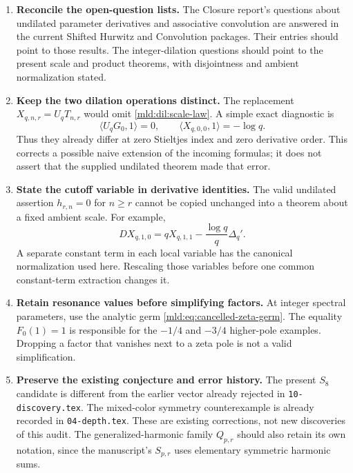 \begin{enumerate}[label=\arabic*.]
\item \textbf{Reconcile the open-question lists.}
The Closure report's questions about undilated parameter derivatives and
associative convolution are answered in the current Shifted Hurwitz and
Convolution packages. Their entries should point to those results.
The integer-dilation questions should point to the present scale and
product theorems, with disjointness and ambient normalization stated.

\item \textbf{Keep the two dilation operations distinct.}
The replacement $X_{q,n,r}=U_qT_{n,r}$ would omit
\eqref{mld:dil:scale-law}. A simple exact diagnostic is
\[
 \langle U_qG_0,1\rangle=0,\qquad
 \langle X_{q,0,0},1\rangle=-\log q.
\]
Thus they already differ at zero Stieltjes index and zero derivative
order. This corrects a possible naive extension of the incoming formulas;
it does not assert that the supplied undilated theorem made that error.

\item \textbf{State the cutoff variable in derivative identities.}
The valid undilated assertion $h_{r,n}=0$ for $n\ge r$ cannot be copied
unchanged into a theorem about a fixed ambient scale. For example,
\[
 DX_{q,1,0}=qX_{q,1,1}-\frac{\log q}{q}\Delta_q'.
\]
A separate constant term in each local variable has the canonical
normalization used here. Rescaling those variables before one common
constant-term extraction changes it.

\item \textbf{Retain resonance values before simplifying factors.}
At integer spectral parameters, use the analytic germ
\eqref{mld:eq:cancelled-zeta-germ}. The equality $F_0(1)=1$ is responsible
for the $-1/4$ and $-3/4$ higher-pole examples. Dropping a factor that
vanishes next to a zeta pole is not a valid simplification.

\item \textbf{Preserve the existing conjecture and error history.}
The present $S_8$ candidate is different from the earlier vector already
rejected in \texttt{10-discovery.tex}. The mixed-color symmetry
counterexample is already recorded in \texttt{04-depth.tex}.
These are existing corrections, not new discoveries of this audit.
The generalized-harmonic family $Q_{p,r}$ should also retain its own
notation, since the manuscript's $S_{p,r}$ uses elementary symmetric
harmonic sums.
\end{enumerate}

